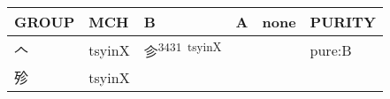 \documentclass[14pt,a4paper]{scrartcl}
\begin{document}
\begin{longtable}[c]{@{}llllll@{}}
\toprule
\begin{minipage}[b]{0.14\columnwidth}\raggedright\strut
GROUP
\strut\end{minipage} &
\begin{minipage}[b]{0.14\columnwidth}\raggedright\strut
MCH
\strut\end{minipage} &
\begin{minipage}[b]{0.14\columnwidth}\raggedright\strut
B
\strut\end{minipage} &
\begin{minipage}[b]{0.14\columnwidth}\raggedright\strut
A
\strut\end{minipage} &
\begin{minipage}[b]{0.14\columnwidth}\raggedright\strut
none
\strut\end{minipage} &
\begin{minipage}[b]{0.14\columnwidth}\raggedright\strut
PURITY
\strut\end{minipage}\tabularnewline
\midrule
\endhead
\begin{minipage}[t]{0.14\columnwidth}\raggedright\strut
𠆢
\strut\end{minipage} &
\begin{minipage}[t]{0.14\columnwidth}\raggedright\strut
tsyinX
\strut\end{minipage} &
\begin{minipage}[t]{0.14\columnwidth}\raggedright\strut
㐱\textsuperscript{3431~tsyinX}
\strut\end{minipage} &
\begin{minipage}[t]{0.14\columnwidth}\raggedright\strut
\strut\end{minipage} &
\begin{minipage}[t]{0.14\columnwidth}\raggedright\strut
\strut\end{minipage} &
\begin{minipage}[t]{0.14\columnwidth}\raggedright\strut
pure:B
\strut\end{minipage}\tabularnewline
\begin{minipage}[t]{0.14\columnwidth}\raggedright\strut
殄
\strut\end{minipage} &
\begin{minipage}[t]{0.14\columnwidth}\raggedright\strut
tsyinX
\strut\end{minipage} &
\begin{minipage}[t]{0.14\columnwidth}\raggedright\strut
\strut\end{minipage} &
\begin{minipage}[t]{0.14\columnwidth}\raggedright\strut

\end{minipage}
\end{longtable}
\end{document}
